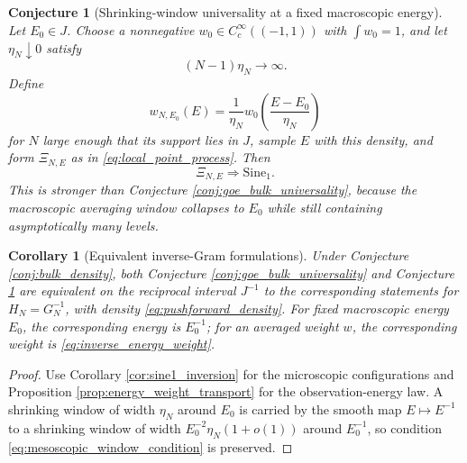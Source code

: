 \documentclass[11pt]{amsart}
\numberwithin{equation}{section}
\theoremstyle{plain}
\newtheorem{corollary}[theorem]{Corollary}
\newtheorem{conjecture}[theorem]{Conjecture}
\theoremstyle{definition}
\theoremstyle{remark}
\begin{document}
\begin{conjecture}[Shrinking-window universality at a fixed macroscopic energy]
\label{conj:fixed_energy_goe}
Let $E_0\in J$.  Choose a nonnegative $w_0\in C_c^\infty((-1,1))$ with $\int w_0=1$, and let $\eta_N\downarrow0$ satisfy
\begin{equation}
(N-1)\eta_N\longrightarrow\infty.
\label{eq:mesoscopic_window_condition}
\end{equation}
Define
\begin{equation}
w_{N,E_0}(E)=\frac1{\eta_N}w_0\!\left(\frac{E-E_0}{\eta_N}\right)
\end{equation}
for $N$ large enough that its support lies in $J$, sample $E$ with this density, and form $\Xi_{N,E}$ as in \eqref{eq:local_point_process}.  Then
\begin{equation}
\Xi_{N,E}\Longrightarrow \mathrm{Sine}_1.
\label{eq:fixed_energy_sine1}
\end{equation}
This is stronger than Conjecture \ref{conj:goe_bulk_universality}, because the macroscopic averaging window collapses to $E_0$ while still containing asymptotically many levels.
\end{conjecture}

\begin{corollary}[Equivalent inverse-Gram formulations]
\label{cor:inverse_goe_equivalence}
Under Conjecture \ref{conj:bulk_density}, both Conjecture \ref{conj:goe_bulk_universality} and Conjecture \ref{conj:fixed_energy_goe} are equivalent on the reciprocal interval $J^{-1}$ to the corresponding statements for $H_N=G_N^{-1}$, with density \eqref{eq:pushforward_density}.  For fixed macroscopic energy $E_0$, the corresponding energy is $E_0^{-1}$; for an averaged weight $w$, the corresponding weight is \eqref{eq:inverse_energy_weight}.
\end{corollary}

\begin{proof}
Use Corollary \ref{cor:sine1_inversion} for the microscopic configurations and Proposition \ref{prop:energy_weight_transport} for the observation-energy law.  A shrinking window of width $\eta_N$ around $E_0$ is carried by the smooth map $E\mapsto E^{-1}$ to a shrinking window of width $E_0^{-2}\eta_N(1+o(1))$ around $E_0^{-1}$, so condition \eqref{eq:mesoscopic_window_condition} is preserved.
\end{proof}
\end{document}
